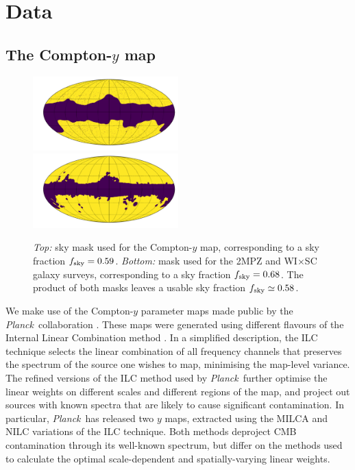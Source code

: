 \documentclass[useAMS,usenatbib]{mn2e}
\newcommand{\wisc}{WI$\times$SC}
\def\planck{{\it Planck\/}}
\begin{document}
\section{Data}\label{sec:data}
  \subsection{The Compton-$y$ map}\label{ssec:data.y}
    \begin{figure}
      \centering
      \includegraphics[width=0.5\textwidth]{mask_y.pdf}
      \includegraphics[width=0.5\textwidth]{mask_g.pdf}
      \caption{{\sl Top:} sky mask used for the Compton-$y$ map, corresponding to a sky fraction $f_{\rm sky}=0.59$. {\sl Bottom:} mask used for the 2MPZ and \wisc~ galaxy surveys, corresponding to a sky fraction $f_{\rm sky}=0.68$. The product of both masks leaves a usable sky fraction $f_{\rm sky}\simeq0.58$.
      }
      \label{fig:msk}
    \end{figure}
    We make use of the Compton-$y$ parameter maps made public by the \planck\ collaboration \citep{2016A&A...594A..22P}. These maps were generated using different flavours of the Internal Linear Combination method \citep{2004ApJ...612..633E,2008arXiv0811.4277V}. In a simplified description, the ILC technique selects the linear combination of all frequency channels that preserves the spectrum of the source one wishes to map, minimising the map-level variance. The refined versions of the ILC method used by \planck\ further optimise the linear weights on different scales and different regions of the map, and project out sources with known spectra that are likely to cause significant contamination. In particular, \planck\ has released two $y$ maps, extracted using the MILCA \citep{2013A&A...558A.118H} and NILC \citep{2011MNRAS.410.2481R} variations of the ILC technique. Both methods deproject CMB contamination through its well-known spectrum, but differ on the methods used to calculate the optimal scale-dependent and spatially-varying linear weights.
    
\end{document}
